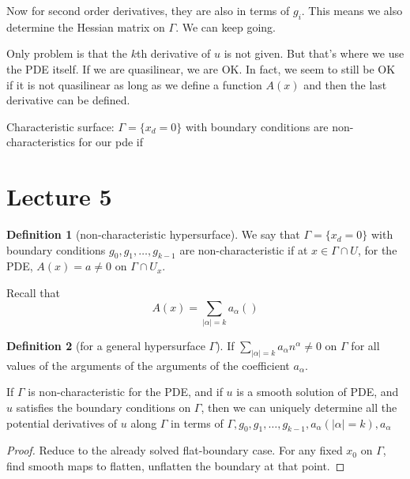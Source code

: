 \documentclass{article}
\numberwithin{equation}{section}
\theoremstyle{definition}
\newtheorem{definition}{Definition}[section]
\newcommand{\set}[1]{\{#1\}}
\begin{document}
Now for second order derivatives, they are also in terms of $g_i$. This means we also determine the Hessian matrix on $\Gamma$. We can keep going.

Only problem is that the $k$th derivative of $u$ is not given. But that's where we use the PDE itself. If we are quasilinear, we are OK. In fact, we seem to still be OK if it is not quasilinear as long as we define a function $A(x)$ and then the last derivative can be defined.

Characteristic surface: $\Gamma = \set{x_d=0}$ with boundary conditions are non-characteristics for our pde if

\section{Lecture 5}
\begin{definition}[non-characteristic hypersurface]
    We say that $\Gamma = \set{x_d = 0}$ with boundary conditions $g_0,g_1,\dots,g_{k-1}$ are non-characteristic if at $x \in \Gamma \cap U$, for the PDE, $A(x) = a \neq 0$ on $\Gamma \cap U_x$.
\end{definition}
Recall that 
\begin{equation}
    A(x) = \sum_{|\alpha| = k}a_{\alpha}()
\end{equation}

\begin{definition}[for a general hypersurface $\Gamma$]
    If $\sum_{|\alpha| = k} a_{\alpha} n^{\alpha} \neq 0$ on $\Gamma$ for all values of the arguments of the arguments of the coefficient $a_{\alpha}$.
\end{definition}

If $\Gamma$ is non-characteristic for the PDE, and if $u$ is a smooth solution of PDE, and $u$ satisfies the boundary conditions on $\Gamma$, then we can uniquely determine all the potential derivatives of $u$ along $\Gamma$ in terms of  $\Gamma, g_0, g_1,\dots,g_{k-1}, a_{\alpha}(|\alpha|=k),a_{\alpha}$

\begin{proof}
    Reduce to  the already solved flat-boundary case. For any fixed $x_0$ on $\Gamma$, find smooth maps to flatten, unflatten the boundary at that point.
    
\end{proof}
\end{document}

